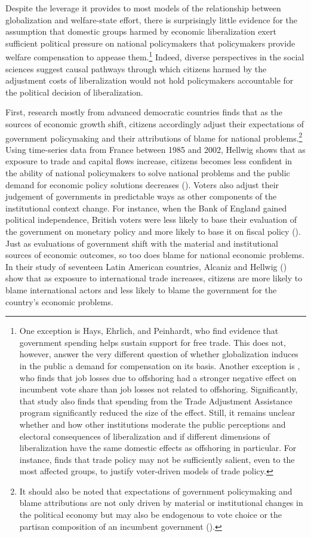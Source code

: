 \documentclass[12pt]{report}
\begin{document}
Despite the leverage it provides to most models of the relationship between globalization and
welfare-state effort, there is surprisingly little evidence for the assumption that domestic groups
harmed by economic liberalization exert sufficient political pressure on national policymakers that
policymakers provide welfare compensation to appease them.\footnote{One exception is Hays,
Ehrlich, and Peinhardt\citeyearpar{Hays:2005vo}, who find evidence that government spending helps
sustain support for free trade. This does not, however, answer the very different question of
whether globalization induces in the public a demand for compensation on its basis. Another
exception is \citealt{Margalit:2011hm}, who finds that job losses due to offshoring had a stronger
negative effect on incumbent vote share than job losses not related to offshoring. Significantly,
that study also finds that spending from the Trade Adjustment Assistance program significantly
reduced the size of the effect. Still, it remains unclear whether and how other institutions
moderate the public perceptions and electoral consequences of liberalization and if different
dimensions of liberalization have the same domestic effects as offshoring in particular. For
instance,\citet{Guisinger:2009vt} finds that trade policy may not be sufficiently salient, even to
the most affected groups, to justify voter-driven models of trade policy.} Indeed, diverse
perspectives in the social sciences suggest causal pathways through which citizens harmed by the
adjustment costs of liberalization would not hold policymakers accountable for the political
decision of liberalization.

First, research mostly from advanced democratic countries finds that as the sources of economic
growth shift, citizens accordingly adjust their expectations of government policymaking and their
attributions of blame for national problems.\footnote{It should also be noted that expectations of
government policymaking and blame attributions are not only driven by material or institutional
changes in the political economy but may also be endogenous to vote choice or the partisan
composition of an incumbent government (\citealt{Wlezien:1997ia}).} Using time-series data from
France between 1985 and 2002, Hellwig shows that as exposure to trade and capital flows increase,
citizens becomes less confident in the ability of national policymakers to solve national problems
and the public demand for economic policy solutions decreases (\citealt{Hellwig:2007wt}). Voters
also adjust their judgement of governments in predictable ways as other components of the
institutional context change. For instance, when the Bank of England gained political independence,
British voters were less likely to base their evaluation of the government on monetary policy and
more likely to base it on fiscal policy (\citealt{:2010fv}). Just as evaluations of government shift
with the material and institutional sources of economic outcomes, so too does blame for national
economic problems. In their study of seventeen Latin American countries, Alcaniz and Hellwig
(\citeyear{Alcaniz:2010gb}) show that as exposure to international trade increases, citizens are
more likely to blame international actors and less likely to blame the government for the country's
economic problems.
\end{document}

